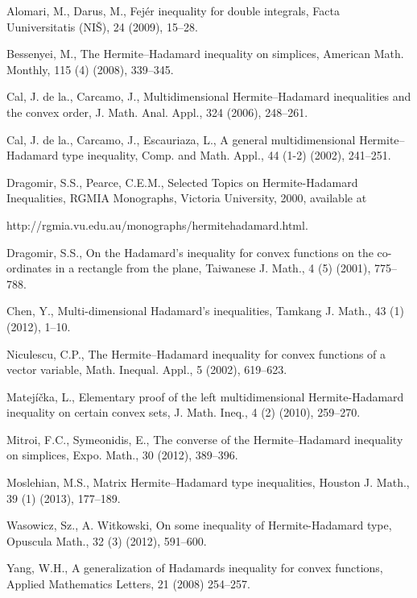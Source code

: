 \documentclass{amsart}
\theoremstyle{plain}
\numberwithin{equation}{section}
\begin{document}

\begin{thebibliography}{99}

Alomari, M., Darus, M., Fej\'{e}r inequality for double integrals,
Facta Uuniversitatis (NI\v{S}),  24 (2009), 15--28.

Bessenyei, M., The Hermite--Hadamard inequality on simplices,
American Math. Monthly, 115 (4) (2008), 339--345.

Cal, J. de la., Carcamo, J.,  Multidimensional Hermite--Hadamard
inequalities and the convex order, J. Math. Anal. Appl., 324
(2006), 248--261.

Cal, J. de la., Carcamo, J., Escauriaza, L., A general
multidimensional Hermite--Hadamard type inequality, Comp. and
Math.  Appl., 44 (1-2) (2002), 241--251.

 Dragomir, S.S.,  Pearce, C.E.M., Selected Topics on Hermite-Hadamard
Inequalities, RGMIA Monographs, Victoria University, 2000,
available at

http://rgmia.vu.edu.au/monographs/hermitehadamard.html.

Dragomir, S.S., On the Hadamard's inequality for convex functions
on the co-ordinates in a rectangle from the plane, Taiwanese J.
Math., 4 (5) (2001), 775--788.

Chen, Y., Multi-dimensional Hadamard's inequalities, Tamkang J.
Math., 43 (1) (2012), 1--10.

Niculescu, C.P., The Hermite--Hadamard inequality for convex
functions of a vector variable, Math. Inequal. Appl., 5 (2002),
619--623.


Matej\'{i}\v{c}ka, L., Elementary proof of the left
multidimensional Hermite-Hadamard inequality on certain convex
sets, J. Math. Ineq., 4 (2) (2010), 259--270.

Mitroi, F.C., Symeonidis, E., The converse of the
Hermite--Hadamard inequality on simplices, Expo. Math., 30 (2012),
389--396.

 Moslehian, M.S., Matrix
Hermite--Hadamard type inequalities, Houston J. Math., 39 (1)
(2013), 177--189.

Wasowicz, Sz., A. Witkowski, On some inequality of
Hermite-Hadamard type, Opuscula Math., 32 (3) (2012), 591--600.

Yang, W.H., A generalization of Hadamards inequality for convex
functions, Applied Mathematics Letters, 21 (2008) 254--257.



\end{thebibliography}
\end{document}
